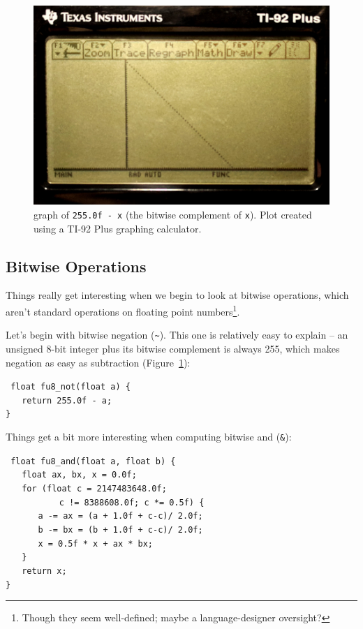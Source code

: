 \documentclass{acmsiggraph}
\theoremstyle{remark}
\theoremstyle{definition}
\begin{document}
\begin{figure}[tb!]
\includegraphics[width=\columnwidth]{not.jpg}
\caption{\label{fig-not-graph} graph of {\tt 255.0f - x} (the bitwise complement of {\tt x}).
{\small Plot created using a TI-92 Plus graphing calculator.}}
\end{figure}


\subsection{Bitwise Operations}

Things really get interesting when we begin to look at bitwise operations, which aren't standard operations on floating point numbers\footnote{Though they seem well-defined; maybe a language-designer oversight?}.

Let's begin with bitwise negation ({\tt \textasciitilde}).
This one is relatively easy to explain -- an unsigned 8-bit integer plus its bitwise complement is always 255, which makes negation as easy as subtraction (Figure~\ref{fig-not-graph}):

{\tt
float fu8\_not(float a) \{ \\
$\phantom{XX}$return 255.0f - a; \\
\}
}

Things get a bit more interesting when computing bitwise and ({\tt \&}):

{\tt
float fu8\_and(float a, float b) \{ \\
$\phantom{XX}$float ax, bx, x = 0.0f; \\
$\phantom{XX}$for (float c = 2147483648.0f;\\
$\phantom{XXXXXX}$ c != 8388608.0f; c *= 0.5f) \{ \\
$\phantom{XXXX}$a -= ax = (a + 1.0f + c-c)/ 2.0f; \\
$\phantom{XXXX}$b -= bx = (b + 1.0f + c-c)/ 2.0f; \\
$\phantom{XXXX}$x = 0.5f * x + ax * bx; \\
$\phantom{XX}$\} \\
$\phantom{XX}$return x; \\
\}
}
\end{document}
